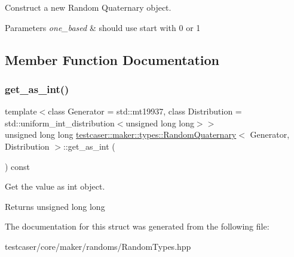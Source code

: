 Construct a new Random Quaternary object. 


\begin{DoxyParams}{Parameters}
{\em one\+\_\+based} & should use start with 0 or 1 \\
\hline
\end{DoxyParams}


\subsection{Member Function Documentation}
\mbox{\label{structtestcaser_1_1maker_1_1types_1_1RandomQuaternary_a169dc529800b0f148800caf1b2d20fb4}} 
\subsubsection{\texorpdfstring{get\+\_\+as\+\_\+int()}{get\_as\_int()}}
{\footnotesize\ttfamily template$<$class Generator = std\+::mt19937, class Distribution = std\+::uniform\+\_\+int\+\_\+distribution$<$unsigned long long$>$$>$ \\
unsigned long long \hyperlink{structtestcaser_1_1maker_1_1types_1_1RandomQuaternary}{testcaser\+::maker\+::types\+::\+Random\+Quaternary}$<$ Generator, Distribution $>$\+::get\+\_\+as\+\_\+int (\begin{DoxyParamCaption}{ }\end{DoxyParamCaption}) const\hspace{0.3cm}{\ttfamily [inline]}}



Get the value as int object. 

\begin{DoxyReturn}{Returns}
unsigned long long 
\end{DoxyReturn}


The documentation for this struct was generated from the following file\+:\begin{DoxyCompactItemize}
\item 
testcaser/core/maker/randoms/Random\+Types.\+hpp\end{DoxyCompactItemize}
